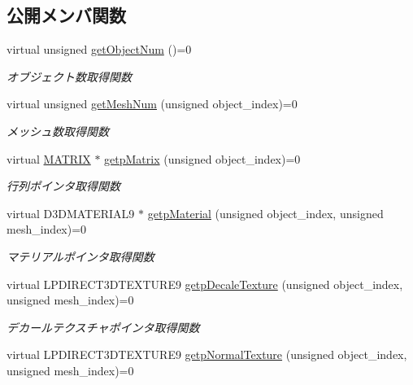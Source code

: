 \subsection*{公開メンバ関数}
\begin{DoxyCompactItemize}
\item 
virtual unsigned \mbox{\hyperlink{class_draw_base_a57c010b4386dc09afa124fba81a6e0fc}{get\+Object\+Num}} ()=0
\begin{DoxyCompactList}\small\item\em オブジェクト数取得関数 \end{DoxyCompactList}\item 
virtual unsigned \mbox{\hyperlink{class_draw_base_add488139aed539e7ccd19492702b4bee}{get\+Mesh\+Num}} (unsigned object\+\_\+index)=0
\begin{DoxyCompactList}\small\item\em メッシュ数取得関数 \end{DoxyCompactList}\item 
virtual \mbox{\hyperlink{_vector3_d_8h_a032295cd9fb1b711757c90667278e744}{M\+A\+T\+R\+IX}} $\ast$ \mbox{\hyperlink{class_draw_base_a60fc3148b2679e4ea7723d2af0c37283}{getp\+Matrix}} (unsigned object\+\_\+index)=0
\begin{DoxyCompactList}\small\item\em 行列ポインタ取得関数 \end{DoxyCompactList}\item 
virtual D3\+D\+M\+A\+T\+E\+R\+I\+A\+L9 $\ast$ \mbox{\hyperlink{class_draw_base_a940543b482e934624637f3c6b4d17f96}{getp\+Material}} (unsigned object\+\_\+index, unsigned mesh\+\_\+index)=0
\begin{DoxyCompactList}\small\item\em マテリアルポインタ取得関数 \end{DoxyCompactList}\item 
virtual L\+P\+D\+I\+R\+E\+C\+T3\+D\+T\+E\+X\+T\+U\+R\+E9 \mbox{\hyperlink{class_draw_base_a9f50a030778dbfca5ae45bb7908e0d58}{getp\+Decale\+Texture}} (unsigned object\+\_\+index, unsigned mesh\+\_\+index)=0
\begin{DoxyCompactList}\small\item\em デカールテクスチャポインタ取得関数 \end{DoxyCompactList}\item 
virtual L\+P\+D\+I\+R\+E\+C\+T3\+D\+T\+E\+X\+T\+U\+R\+E9 \mbox{\hyperlink{class_draw_base_a76c3b910b495fcf69aacf6164ca90c7d}{getp\+Normal\+Texture}} (unsigned object\+\_\+index, unsigned mesh\+\_\+index)=0

\end{DoxyCompactItemize}

